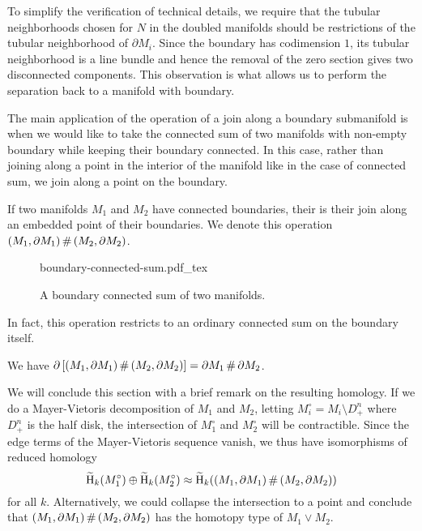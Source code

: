 \begin{remark*}
	To simplify the verification of technical details, we require that the tubular neighborhoods chosen for $N$ in the doubled manifolds should be restrictions of the tubular neighborhood of $\partial M_i$. Since the boundary has codimension $1$, its tubular neighborhood is a line bundle and hence the removal of the zero section gives two disconnected components. This observation is what allows us to perform the separation back to a manifold with boundary.
\end{remark*}

The main application of the operation of a join along a boundary submanifold is when we would like to take the connected sum of two manifolds with non-empty boundary while keeping their boundary connected. In this case, rather than joining along a point in the interior of the manifold like in the case of connected sum, we join along a point on the boundary.

\begin{definition}
	If two manifolds $M_1$ and $M_2$ have connected boundaries, their  is their join along an embedded point of their boundaries. We denote this operation $(M_1,\partial M_1)\+ (M_2,\partial M_2)$.
\end{definition}

\begin{figure}[ht]
	\centering
	{boundary-connected-sum.pdf_tex}
	\caption{A boundary connected sum of two manifolds.}\label{fig:boundary-connected-sum}
\end{figure}

In fact, this operation restricts to an ordinary connected sum on the boundary itself.

\begin{proposition} We have $\partial\left[(M_1,\partial M_1)\+ (M_2,\partial M_2)\right] = \partial M_1\+\partial M_2$.
\end{proposition}

We will conclude this section with a brief remark on the resulting homology. If we do a Mayer-Vietoris decomposition of $M_1$ and $M_2$, letting $M_i^\circ=M_i\setminus D^n_+$ where $D^n_+$ is the half disk, the intersection of $M_1^\circ$ and $M_2^\circ$ will be contractible. Since the edge terms of the Mayer-Vietoris sequence vanish, we thus have isomorphisms of reduced homology
\[
		\Hr_k(M_1^\circ)\oplus \Hr_k(M_2^\circ) \cong \Hr_k((M_1,\partial M_1)\+ (M_2,\partial M_2))
\]
for all $k$. Alternatively, we could collapse the intersection to a point and conclude that $(M_1,\partial M_1)\+(M_2,\partial M_2)$ has the homotopy type of $M_1\vee M_2$.

